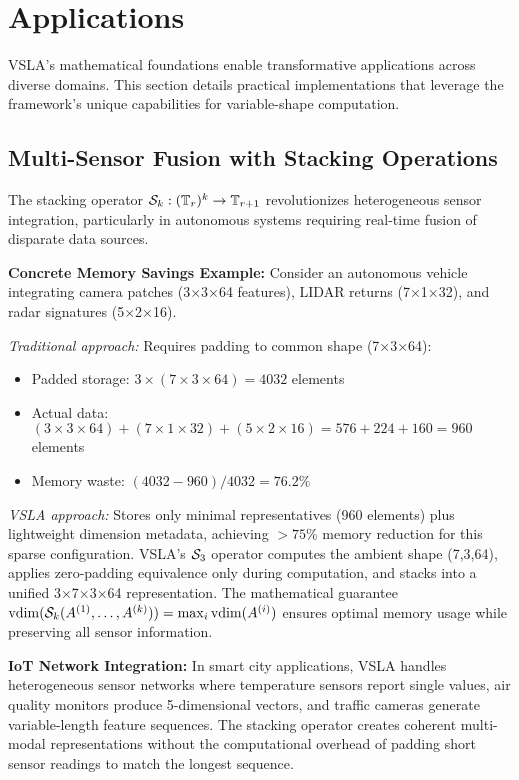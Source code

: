 \section{Applications}
\label{sec:applications}

VSLA's mathematical foundations enable transformative applications across diverse domains. This section details practical implementations that leverage the framework's unique capabilities for variable-shape computation.

\subsection{Multi-Sensor Fusion with Stacking Operations}

The stacking operator $\mathcal{S}_k: (\mathbb{T}_r)^k \to \mathbb{T}_{r+1}$ revolutionizes heterogeneous sensor integration, particularly in autonomous systems requiring real-time fusion of disparate data sources.

\textbf{Concrete Memory Savings Example:} Consider an autonomous vehicle integrating camera patches (3×3×64 features), LIDAR returns (7×1×32), and radar signatures (5×2×16). 

\textit{Traditional approach:} Requires padding to common shape (7×3×64):
\begin{itemize}
\item Padded storage: $3 \times (7 \times 3 \times 64) = 4032$ elements
\item Actual data: $(3 \times 3 \times 64) + (7 \times 1 \times 32) + (5 \times 2 \times 16) = 576 + 224 + 160 = 960$ elements
\item Memory waste: $(4032 - 960) / 4032 = 76.2\%$
\end{itemize}

\textit{VSLA approach:} Stores only minimal representatives (960 elements) plus lightweight dimension metadata, achieving $>75\%$ memory reduction for this sparse configuration. VSLA's $\mathcal{S}_3$ operator computes the ambient shape (7,3,64), applies zero-padding equivalence only during computation, and stacks into a unified 3×7×3×64 representation. The mathematical guarantee $\operatorname{vdim}(\mathcal{S}_k(A^{(1)}, \ldots, A^{(k)})) = \max_i \operatorname{vdim}(A^{(i)})$ ensures optimal memory usage while preserving all sensor information.

\textbf{IoT Network Integration:} In smart city applications, VSLA handles heterogeneous sensor networks where temperature sensors report single values, air quality monitors produce 5-dimensional vectors, and traffic cameras generate variable-length feature sequences. The stacking operator creates coherent multi-modal representations without the computational overhead of padding short sensor readings to match the longest sequence.

